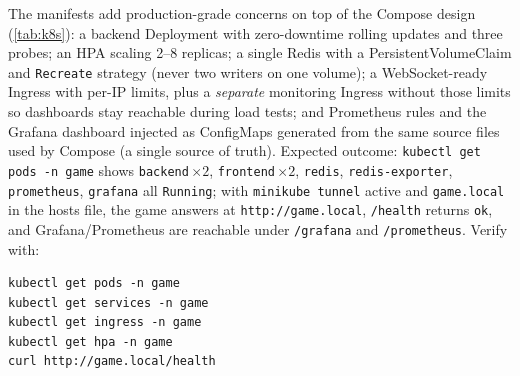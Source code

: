 \documentclass{scrartcl}
\begin{document}
The manifests add production-grade concerns on top of the Compose design
(\cref{tab:k8s}): a backend Deployment with zero-downtime rolling updates and three
probes; an HPA scaling 2--8 replicas; a single Redis with a PersistentVolumeClaim
and \texttt{Recreate} strategy (never two writers on one volume); a
WebSocket-ready Ingress with per-IP limits, plus a \emph{separate} monitoring
Ingress without those limits so dashboards stay reachable during load tests; and
Prometheus rules and the Grafana dashboard injected as ConfigMaps generated from
the same source files used by Compose (a single source of truth). Expected
outcome: \texttt{kubectl get pods -n game} shows \texttt{backend}\,$\times2$,
\texttt{frontend}\,$\times2$, \texttt{redis}, \texttt{redis-exporter},
\texttt{prometheus}, \texttt{grafana} all \texttt{Running}; with
\texttt{minikube tunnel} active and \texttt{game.local} in the hosts file, the
game answers at \texttt{http://game.local}, \texttt{/health} returns \texttt{ok},
and Grafana/Prometheus are reachable under \texttt{/grafana} and
\texttt{/prometheus}. Verify with:

\begin{verbatim}
kubectl get pods -n game
kubectl get services -n game
kubectl get ingress -n game
kubectl get hpa -n game
curl http://game.local/health
\end{verbatim}
\end{document}
